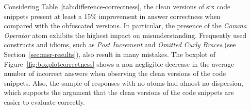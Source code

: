 Considering Table~\ref{tab:difference-correctness}, the clean versions of six code snippets present at least a 15\% improvement in answer correctness when compared with the obfuscated versions. In particular, the presence of the \emph{Comma Operator} atom exhibits the highest impact on misunderstanding. 
Frequently used constructs and idioms, such as \emph{Post Increment} and \emph{Omitted Curly Braces} (see Section~\ref{sec:msr-results}), also result in many mistakes. %
The boxplot of Figure~\ref{fig:boxplotcorrectness} shows a non-negligible decrease in the average number of incorrect answers when observing the clean versions of the code snippets. Also, the sample of responses with no atoms had almost no dispersion, which supports the argument that the clean versions of the code snippets are easier to evaluate correctly. 



